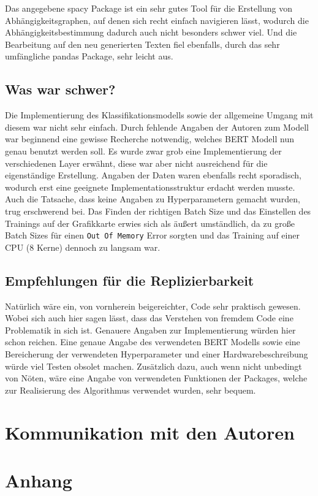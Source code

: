 \documentclass[DIV=13,fontsize=11pt]{scrartcl}
\begin{document}
Das angegebene spacy Package ist ein sehr gutes Tool für die Erstellung von Abhängigkeitsgraphen, auf denen sich recht
einfach navigieren lässt, wodurch die Abhängigkeitsbestimmung dadurch auch nicht besonders schwer viel. Und die Bearbeitung
auf den neu generierten Texten fiel ebenfalls, durch das sehr umfängliche pandas Package, sehr leicht aus.

\subsection{Was war schwer?}
Die Implementierung des Klassifikationsmodells sowie der allgemeine Umgang mit diesem war nicht sehr einfach.
Durch fehlende Angaben der Autoren zum Modell war beginnend eine gewisse Recherche notwendig, welches BERT Modell nun genau
benutzt werden soll. Es wurde zwar grob eine Implementierung der verschiedenen Layer erwähnt, diese war aber nicht ausreichend
für die eigenständige Erstellung. Angaben der Daten waren ebenfalls recht sporadisch, wodurch erst eine geeignete Implementationsstruktur
erdacht werden musste. Auch die Tatsache, dass keine Angaben zu Hyperparametern gemacht wurden, trug erschwerend bei. Das Finden der richtigen
Batch Size und das Einstellen des Trainings auf der Grafikkarte erwies sich als äußert umständlich, da zu große Batch Sizes für einen
\texttt{Out Of Memory} Error sorgten und das Training auf einer CPU (8 Kerne) dennoch zu langsam war.

\subsection{Empfehlungen für die Replizierbarkeit}
Natürlich wäre ein, von vornherein beigereichter, Code sehr praktisch gewesen. Wobei sich auch hier sagen lässt, dass das Verstehen von
fremdem Code eine Problematik in sich ist. Genauere Angaben zur Implementierung würden hier schon reichen. Eine genaue Angabe des verwendeten
BERT Modells sowie eine Bereicherung der verwendeten Hyperparameter und einer Hardwarebeschreibung würde viel Testen obsolet machen.
Zusätzlich dazu, auch wenn nicht unbedingt von Nöten, wäre eine Angabe von verwendeten Funktionen der Packages, welche zur Realisierung
des Algorithmus verwendet wurden, sehr bequem.

\section{Kommunikation mit den Autoren}

\section{Anhang}
\end{document}
